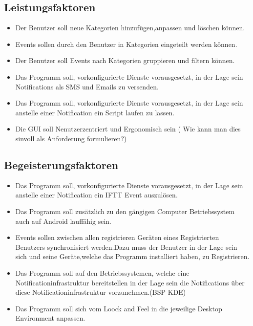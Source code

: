 \documentclass[11pt,titelpage]{scrreprt}
\begin{document}
\subsection{Leistungsfaktoren}
\begin{itemize}
\item
Der Benutzer soll  neue Kategorien hinzufügen,anpassen und löschen können.
\item
Events sollen durch den Benutzer in Kategorien eingeteilt werden können.
\item
Der Benutzer soll Events nach Kategorien gruppieren und filtern können.

\item
Das Programm soll, vorkonfigurierte Dienste vorausgesetzt,  in der Lage sein Notifications   als SMS und Emails  zu versenden.

\item
Das Programm soll, vorkonfigurierte Dienste vorausgesetzt,  in der Lage sein anstelle einer Notification ein Script laufen zu lassen.

\item
Die GUI soll Nenutzerzentriert und Ergonomisch sein ( Wie kann man dies sinvoll als Anforderung formulieren?)
\end{itemize}

\subsection{Begeisterungsfaktoren}


\begin{itemize}
\item
Das Programm  soll, vorkonfigurierte Dienste vorausgesetzt,  in der Lage sein anstelle einer Notification  ein IFTT Event auszulösen.

\item
Das Programm soll zusätzlich zu den gängigen Computer Betriebssystem auch auf Android lauffähig sein.

\item
Events sollen zwischen allen registrieren Geräten eines Registrierten Benutzers synchronisiert werden.Dazu muss der Benutzer in der Lage sein sich und seine Geräte,welche das Programm installiert haben, zu Registrieren.

\item
Das Programm soll auf den Betriebssystemen, welche eine Notificationinfrastruktur bereitstellen  in der Lage sein die Notifications über diese Notificationinfrastruktur vorzunehmen.(BSP KDE)

\item
Das Programm soll sich vom Loock and Feel in die jeweilige Desktop Environment anpassen.

\end{itemize}
\end{document}
